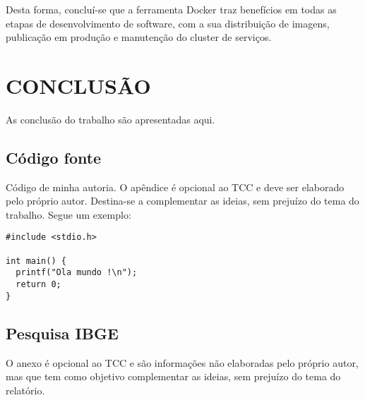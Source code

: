 \documentclass[
	12pt,				%
	openright,			%
	oneside,			%
	a4paper,			%
	chapter=TITLE,		%
	section=TITLE,		%
	english,			%
	french,				%
	spanish,			%
	brazil				%
	]{abntex2}
\begin{document}
Desta forma, concluí-se que a ferramenta Docker traz benefícios em todas as etapas de desenvolvimento de software, com a sua distribuição de imagens, publicação em produção e manutenção do cluster de serviços.

\chapter{CONCLUSÃO}

As conclusão do trabalho são apresentadas aqui.





%
%


\begin{apendicesenv}

\chapter{Código fonte}
Código de minha autoria. O apêndice é opcional ao TCC e deve ser elaborado pelo próprio autor. Destina-se a complementar as ideias, sem prejuízo do tema do trabalho. Segue um exemplo:

\scriptsize
\begin{lstlisting}
#include <stdio.h>

int main() {
  printf("Ola mundo !\n");
  return 0;
}
\end{lstlisting}

\end{apendicesenv}

\begin{anexosenv}

\chapter{Pesquisa IBGE}
O anexo é opcional ao TCC e são informações não elaboradas pelo próprio autor, mas que tem como objetivo complementar as ideias, sem prejuízo do tema do relatório.

\end{anexosenv}
\end{document}
